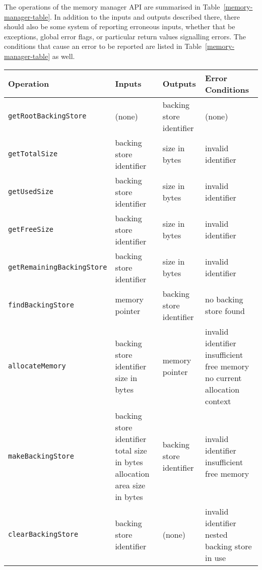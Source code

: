 The operations of the memory manager API are summarised in
Table~\ref{memory-manager-table}.
In addition to the inputs and outputs described there, there should
also be some system of reporting erroneous inputs, whether that be
exceptions, global error flags, or particular return values signalling
errors.
The conditions that cause an error to be reported are listed in
Table~\ref{memory-manager-table} as well.

\begin{table*}[ht]
  \centering
  \footnotesize
  \begin{tabular}{|l|p{3.1cm}|p{3.1cm}|p{3.9cm}|}
    Operation & Inputs & Outputs & Error Conditions \\
    \hline
    \texttt{getRootBackingStore} &
    (none) &
    backing store identifier &
    (none)
    \\\texttt{getTotalSize} &
    backing store identifier &
    size in bytes &
    invalid identifier
    \\\texttt{getUsedSize} &
    backing store identifier &
    size in bytes &
    invalid identifier
    \\\texttt{getFreeSize} &
    backing store identifier &
    size in bytes &
    invalid identifier
    \\\texttt{getRemainingBackingStore} &
    backing store identifier &
    size in bytes &
    invalid identifier                           
    \\\texttt{findBackingStore} &
    memory pointer &
    backing store identifier &
    no backing store found
    \\\texttt{allocateMemory} &
    backing store identifier \newline
    size in bytes &
    memory pointer &
    invalid identifier \newline
    insufficient free memory \newline
    no current allocation context
    \\\texttt{makeBackingStore} &
    backing store identifier \newline
    total size in bytes \newline
    allocation area size in bytes &                      
    backing store identifier &
    invalid identifier \newline
    insufficient free memory
    \\\texttt{clearBackingStore} &
    backing store identifier &
    (none) &
    invalid identifier \newline
    nested backing store in use

\end{tabular}
\end{table*}
